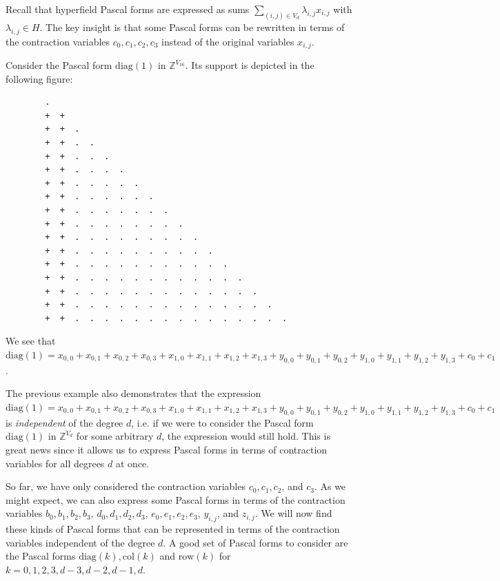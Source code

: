 Recall that hyperfield Pascal forms are expressed as sums \( \sum_{(i,j) \in V_d} \lambda_{i,j} x_{i,j} \) with \( \lambda_{i,j} \in H \). The key insight is that some Pascal forms can be rewritten in terms of the contraction variables \( c_0, c_1, c_2, c_3 \) instead of the original variables \( x_{i,j} \).

\begin{example}
    Consider the Pascal form \( \mathrm{diag}(1) \) in \( \mathbb{Z}^{V_{16}} \). Its support is depicted in the following figure:
    \begin{verbatim}
        .
        +  +
        +  +  . 
        +  +  .  .  
        +  +  .  .  .  
        +  +  .  .  .  .  
        +  +  .  .  .  .  .  
        +  +  .  .  .  .  .  .  
        +  +  .  .  .  .  .  .  .
        +  +  .  .  .  .  .  .  .  .  
        +  +  .  .  .  .  .  .  .  .  .
        +  +  .  .  .  .  .  .  .  .  .  .
        +  +  .  .  .  .  .  .  .  .  .  .  .
        +  +  .  .  .  .  .  .  .  .  .  .  .  .
        +  +  .  .  .  .  .  .  .  .  .  .  .  .  .
        +  +  .  .  .  .  .  .  .  .  .  .  .  .  .  .
        +  +  .  .  .  .  .  .  .  .  .  .  .  .  .  .  .
    \end{verbatim}
    We see that \( \mathrm{diag}(1) = x_{0,0} + x_{0,1} + x_{0,2} + x_{0,3} + x_{1,0} + x_{1,1} + x_{1,2} + x_{1,3} + y_{0,0} + y_{0,1} + y_{0,2} + y_{1,0} + y_{1,1} + y_{1,2} + y_{1,3} + c_0 + c_1\).
\end{example}

The previous example also demonstrates that the expression \( \mathrm{diag}(1) = x_{0,0} + x_{0,1} + x_{0,2} + x_{0,3} + x_{1,0} + x_{1,1} + x_{1,2} + x_{1,3} + y_{0,0} + y_{0,1} + y_{0,2} + y_{1,0} + y_{1,1} + y_{1,2} + y_{1,3} + c_0 + c_1 \) is \emph{independent} of the degree \( d \), i.e. if we were to consider the Pascal form \( \mathrm{diag}(1) \) in \( \mathbb{Z}^{V_{d}} \) for some arbitrary \( d \), the expression would still hold. This is great news since it allows us to express Pascal forms in terms of contraction variables for all degrees \( d \) at once.

So far, we have only considered the contraction variables \( c_0, c_1, c_2 \), and \( c_3 \). As we might expect, we can also express some Pascal forms in terms of the contraction variables \( b_0, b_1, b_2, b_3 \), \( d_0, d_1, d_2, d_3 \), \( e_0, e_1, e_2, e_3 \), \( y_{i,j} \), and \( z_{i,j} \). We will now find these kinds of Pascal forms that can be represented in terms of the contraction variables independent of the degree \( d \). A good set of Pascal forms to consider are the Pascal forms \( \mathrm{diag}(k),  \mathrm{col}(k) \) and \( \mathrm{row}(k) \) for \( k = 0,1,2,3,d-3,d-2,d-1,d \).

